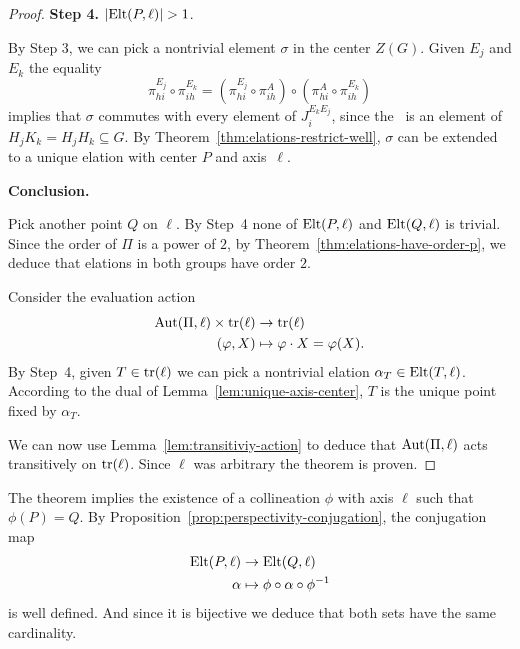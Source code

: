 \begin{proof}
    \medskip

    \textbf{Step 4.} $|\Elt(P,\ell)|>1$.

    By Step 3, we can pick a nontrivial element $\sigma$ in the center $Z(G)$. Given $E_j$ and $E_k$ the equality
    \[
        \pi_{hi}^{E_j}\circ\pi_{ih}^{E_k}
            = (\pi_{hi}^{E_j}\circ\pi_{ih}^A)\circ
                (\pi_{hi}^A\circ\pi_{ih}^{E_k})
    \]
    implies that $\sigma$ commutes with every element of $J_i^{E_kE_j}$, since the \rhs\ is an element of $H_jK_k=H_jH_k\subseteq G$. By Theorem~\ref{thm:elations-restrict-well}, $\sigma$ can be extended to a unique elation with center $P$ and axis~$\ell$.
    
    \medskip

    \textbf{Conclusion.}

    Pick another point $Q$ on $\ell$. By Step~4 none of $\mathrm{Elt}(P,\ell)$ and $\mathrm{Elt}(Q,\ell)$ is trivial. Since the order of $\Pi$ is a power of $2$, by Theorem~\ref{thm:elations-have-order-p}, we deduce that elations in both groups have order $2$.
    
    Consider the evaluation action
    \begin{align*}
        \operatorname{Aut}(\Pi,\ell)\times\operatorname{tr}(\ell)&\to\operatorname{tr}(\ell)\\
        (\varphi,X) &\mapsto \varphi\cdot X=\varphi(X).
    \end{align*}
    By Step~4, given $T\in\operatorname{tr}(\ell)$ we can pick a nontrivial elation $\alpha_T\in\mathrm{Elt}(T,\ell)$. According to the dual of Lemma~\ref{lem:unique-axis-center}, $T$ is the unique point fixed by $\alpha_T$.

    We can now use Lemma~\ref{lem:transitiviy-action} to deduce that $\operatorname{Aut}(\Pi,\ell)$ acts transitively on $\operatorname{tr}(\ell)$. Since $\ell$ was arbitrary the theorem is proven.
    
\end{proof}

\begin{rem}
    The theorem implies the existence of a collineation $\phi$ with axis $\ell$ such that $\phi(P)=Q$. By Proposition~\ref{prop:perspectivity-conjugation}, the conjugation map
    \begin{align*}
        \mathrm{Elt}(P,\ell)&\to\mathrm{Elt}(Q,\ell)\\
        \alpha&\mapsto\phi\circ\alpha\circ\phi^{-1}
    \end{align*}
    is well defined. And since it is bijective we deduce that both sets have the same cardinality.
\end{rem}

